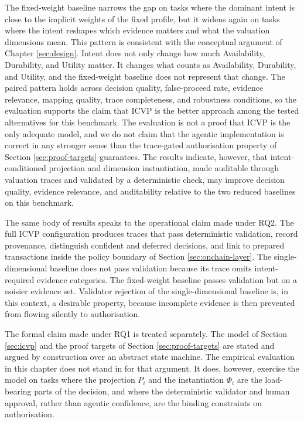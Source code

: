 The fixed-weight baseline narrows the gap on tasks where the dominant intent is close to the implicit weights of the fixed profile, but it widens again on tasks where the intent reshapes which evidence matters and what the valuation dimensions mean. This pattern is consistent with the conceptual argument of Chapter \ref{sec:design}. Intent does not only change how much Availability, Durability, and Utility matter. It changes what counts as Availability, Durability, and Utility, and the fixed-weight baseline does not represent that change. The paired pattern holds across decision quality, false-proceed rate, evidence relevance, mapping quality, trace completeness, and robustness conditions, so the evaluation supports the claim that ICVP is the better approach among the tested alternatives for this benchmark. The evaluation is not a proof that ICVP is the only adequate model, and we do not claim that the agentic implementation is correct in any stronger sense than the trace-gated authorisation property of Section \ref{sec:proof-targets} guarantees. The results indicate, however, that intent-conditioned projection and dimension instantiation, made auditable through valuation traces and validated by a deterministic check, may improve decision quality, evidence relevance, and auditability relative to the two reduced baselines on this benchmark.

The same body of results speaks to the operational claim made under RQ2. The full ICVP configuration produces traces that pass deterministic validation, record provenance, distinguish confident and deferred decisions, and link to prepared transactions inside the policy boundary of Section \ref{sec:onchain-layer}. The single-dimensional baseline does not pass validation because its trace omits intent-required evidence categories. The fixed-weight baseline passes validation but on a noisier evidence set. Validator rejection of the single-dimensional baseline is, in this context, a desirable property, because incomplete evidence is then prevented from flowing silently to authorisation.

The formal claim made under RQ1 is treated separately. The model of Section \ref{sec:icvp} and the proof targets of Section \ref{sec:proof-targets} are stated and argued by construction over an abstract state machine. The empirical evaluation in this chapter does not stand in for that argument. It does, however, exercise the model on tasks where the projection $P_i$ and the instantiation $\Phi_i$ are the load-bearing parts of the decision, and where the deterministic validator and human approval, rather than agentic confidence, are the binding constraints on authorisation.
